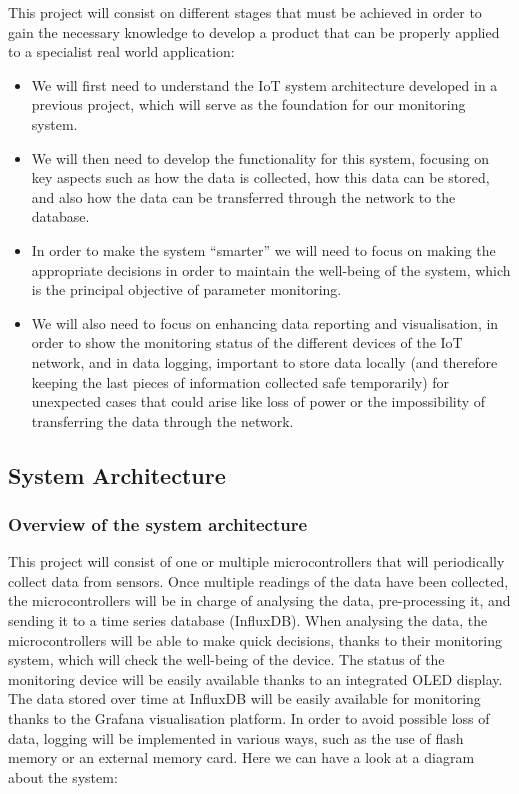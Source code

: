 \documentclass[12pt]{article}
\begin{document}
This project will consist on different stages that must be achieved in order to gain the necessary knowledge to develop a product that can be properly applied to a specialist real world application: 
\begin{itemize}
    \item We will first need to understand the IoT system architecture developed in a previous project, which will serve as the foundation for our monitoring system.
    \item We will then need to develop the functionality for this system, focusing on key aspects such as how the data is collected, how this data can be stored, and also how the data can be transferred through the network to the database.
    \item In order to make the system ``smarter'' we will need to focus on making the appropriate decisions in order to maintain the well-being of the system, which is the principal objective of parameter monitoring.
    \item We will also need to focus on enhancing data reporting and visualisation, in order to show the monitoring status of the different devices of the IoT network, and in data logging, important to store data locally (and therefore keeping the last pieces of information collected safe temporarily) for unexpected cases that could arise like loss of power or the impossibility of transferring the data through the network.
\end{itemize}   

\subsection{System Architecture}

\subsubsection{Overview of the system architecture}

This project will consist of one or multiple microcontrollers that will periodically collect data from sensors. Once multiple readings of the data have been collected, the microcontrollers will be in charge of analysing the data, pre-processing it, and sending it to a time series database (InfluxDB). When analysing the data, the microcontrollers will be able to make quick decisions, thanks to their monitoring system, which will check the well-being of the device. The status of the monitoring device will be easily available thanks to an integrated OLED display. The data stored over time at InfluxDB will be easily available for monitoring thanks to the Grafana visualisation platform. In order to avoid possible loss of data, logging will be implemented in various ways, such as the use of flash memory or an external memory card. Here we can have a look at a diagram about the system:
\end{document}
